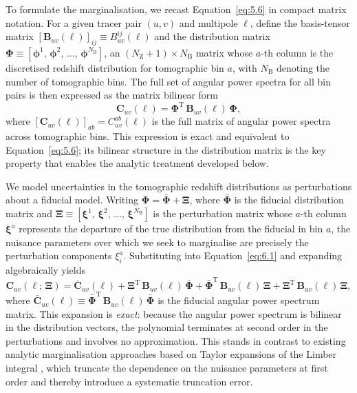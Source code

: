 To formulate the marginalisation, we recast Equation~\ref{eq:5.6} in compact matrix notation. For a given tracer pair \((u,v)\) and multipole \(\ell\), define the basis-tensor matrix \([\boldsymbol{B}_{uv}(\ell)]_{ij} \equiv B_{uv}^{ij}(\ell)\) and the distribution matrix \(\boldsymbol{\Phi} \equiv [\boldsymbol{\phi}^1,\,\boldsymbol{\phi}^2,\,\ldots,\,\boldsymbol{\phi}^{N_\mathrm{B}}]\), an \((N_\mathrm{Z}{+}1) \times N_\mathrm{B}\) matrix whose \(a\)-th column is the discretised redshift distribution for tomographic bin \(a\), with \(N_\mathrm{B}\) denoting the number of tomographic bins. The full set of angular power spectra for all bin pairs is then expressed as the matrix bilinear form
\begin{equation} \label{eq:6.1}
    \boldsymbol{C}_{uv}(\ell) = \boldsymbol{\Phi}^{\mathrm{T}}\, \boldsymbol{B}_{uv}(\ell)\, \boldsymbol{\Phi},
\end{equation}
where \([\boldsymbol{C}_{uv}(\ell)]_{ab} = C_{uv}^{ab}(\ell)\) is the full matrix of angular power spectra across tomographic bins. This expression is exact and equivalent to Equation~\ref{eq:5.6}; its bilinear structure in the distribution matrix is the key property that enables the analytic treatment developed below.

We model uncertainties in the tomographic redshift distributions as perturbations about a fiducial model. Writing \(\boldsymbol{\Phi} = \bar{\boldsymbol{\Phi}} + \boldsymbol{\Xi}\), where \(\bar{\boldsymbol{\Phi}}\) is the fiducial distribution matrix and \(\boldsymbol{\Xi} \equiv [\boldsymbol{\xi}^1,\, \boldsymbol{\xi}^2,\, \ldots,\, \boldsymbol{\xi}^{N_\mathrm{B}}]\) is the perturbation matrix whose \(a\)-th column \(\boldsymbol{\xi}^a\) represents the departure of the true distribution from the fiducial in bin \(a\), the nuisance parameters over which we seek to marginalise are precisely the perturbation components \(\xi^a_i\). Substituting into Equation~\ref{eq:6.1} and expanding algebraically yields
\begin{equation} \label{eq:6.2}
    \boldsymbol{C}_{uv}(\ell;\,\boldsymbol{\Xi}) = \bar{\boldsymbol{C}}_{uv}(\ell) + \boldsymbol{\Xi}^{\mathrm{T}}\, \boldsymbol{B}_{uv}(\ell)\, \bar{\boldsymbol{\Phi}} + \bar{\boldsymbol{\Phi}}^{\mathrm{T}}\, \boldsymbol{B}_{uv}(\ell)\, \boldsymbol{\Xi} + \boldsymbol{\Xi}^{\mathrm{T}}\, \boldsymbol{B}_{uv}(\ell)\, \boldsymbol{\Xi},
\end{equation}
where \(\bar{\boldsymbol{C}}_{uv}(\ell) \equiv \bar{\boldsymbol{\Phi}}^{\mathrm{T}}\, \boldsymbol{B}_{uv}(\ell)\, \bar{\boldsymbol{\Phi}}\) is the fiducial angular power spectrum matrix. This expansion is \textit{exact}: because the angular power spectrum is bilinear in the distribution vectors, the polynomial terminates at second order in the perturbations and involves no approximation. This stands in contrast to existing analytic marginalisation approaches based on Taylor expansions of the Limber integral \citep{2020JCAP...10..056H, 2023MNRAS.522.5037R, 2023OJAp....6E..23H, 2025A&A...693A.178R, 2025arXiv250600758B, 2026arXiv260424425R}, which truncate the dependence on the nuisance parameters at first order and thereby introduce a systematic truncation error.


